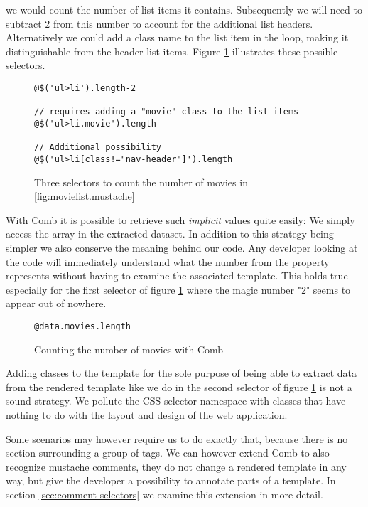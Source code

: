 \documentclass[thesis.tex]{subfiles}
\begin{document}
we would count the number of list items it contains. Subsequently we will need
to subtract 2 from this number to account for the additional list headers.
Alternatively we could add a class name to the list item in the
 loop, making it distinguishable from the header list
items.
Figure \ref{fig:movielist-jquery.js} illustrates these possible selectors.
\begin{figure}
	\centering
	\begin{lstlisting}
@$('ul>li').length-2

// requires adding a "movie" class to the list items
@$('ul>li.movie').length

// Additional possibility
@$('ul>li[class!="nav-header"]').length
	\end{lstlisting}
	\caption{Three selectors to count the number of movies in \ref{fig:movielist.mustache}}
	\label{fig:movielist-jquery.js}
\end{figure}

With Comb it is possible to retrieve such \emph{implicit} values quite easily:
We simply access the  array in the extracted dataset.
In addition to this strategy being simpler we also conserve the meaning behind
our code. Any developer looking at the code will immediately understand what
the number from the  property represents without having to
examine the associated template. This holds true especially for the first
selector of figure \ref{fig:movielist-jquery.js} where the magic number "2"
seems to appear out of nowhere.
\begin{figure}
	\centering
	\begin{lstlisting}
@data.movies.length
	\end{lstlisting}
	\caption{Counting the number of movies with Comb}
	\label{fig:movielist-comb.js}
\end{figure}
Adding classes to the template for the sole purpose of being able to extract
data from the rendered template like we do in the second selector of figure
\ref{fig:movielist-jquery.js} is not a sound strategy. We pollute the CSS
selector namespace with classes that have nothing to do with the layout and
design of the web application.

Some scenarios may however require us to do exactly that, because there is no
section surrounding a group of tags. We can however extend Comb to also
recognize mustache comments, they do not change a rendered template in any way,
but give the developer a possibility to annotate parts of a template. In section
\ref{sec:comment-selectors} we examine this extension in more detail.
\end{document}

